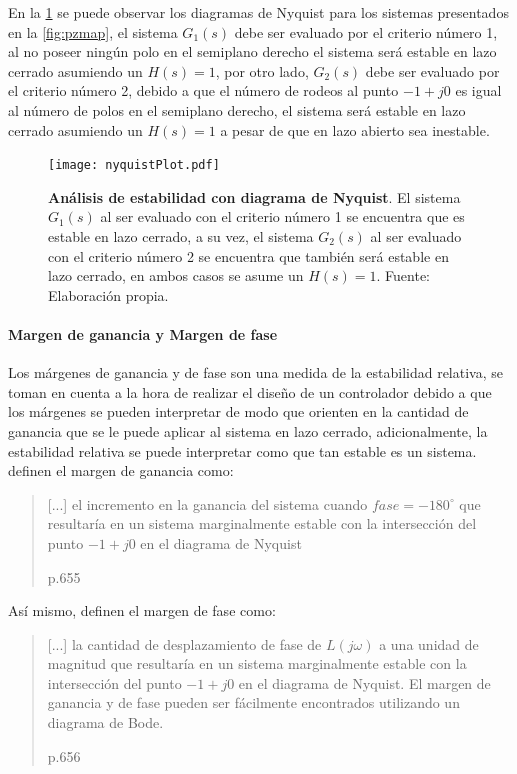                 En la \cref{fig:nyquistPlot} se puede observar los diagramas de Nyquist para los sistemas presentados en la \cref{fig:pzmap}, el sistema $G_1(s)$ debe ser evaluado por el criterio número 1, al no poseer ningún polo en el semiplano derecho el sistema será estable en lazo cerrado asumiendo un $H(s) = 1$, por otro lado, $G_2(s)$ debe ser evaluado por el criterio número 2, debido a que el número de rodeos al punto $-1 + j0$ es igual al número de polos en el semiplano derecho, el sistema será estable en lazo cerrado asumiendo un $H(s) = 1$ a pesar de que en lazo abierto sea inestable.

                \begin{figure}[htb]
                    \centering
                    \texttt{[image: nyquistPlot.pdf]}
                    \caption[Ejemplo de análisis de estabilidad con diagrama de Nyquist]{\textbf{Análisis de estabilidad con diagrama de Nyquist}. El sistema $G_1(s)$ al ser evaluado con el criterio número 1 se encuentra que es estable en lazo cerrado, a su vez, el sistema $G_2(s)$ al ser evaluado con el criterio número 2 se encuentra que también será estable en lazo cerrado, en ambos casos se asume un $H(s) = 1$. Fuente: Elaboración propia.} 
                    \label{fig:nyquistPlot}
                \end{figure}
            
            \paragraph{Margen de ganancia y Margen de fase}
                
                Los márgenes de ganancia y de fase son una medida de la estabilidad relativa, se toman en cuenta a la hora de realizar el diseño de un controlador debido a que los márgenes se pueden interpretar de modo que orienten en la cantidad de ganancia que se le puede aplicar al sistema en lazo cerrado, adicionalmente, la estabilidad relativa se puede interpretar como que tan estable es un sistema. \textcite{dorf2011modern} definen el margen de ganancia como: \blockquote[p.655]{[...] el incremento en la ganancia del sistema cuando $fase = -180^\circ$ que resultaría en un sistema marginalmente estable con la intersección del punto $-1 + j0$ en el diagrama de Nyquist}. Así mismo, \textcite{dorf2011modern} definen el margen de fase como: \blockquote[p.656]{[...] la cantidad de desplazamiento de fase de $L(j\omega)$ a una unidad de magnitud que resultaría en un sistema marginalmente estable con la intersección del punto $-1 + j0$ en el diagrama de Nyquist. El margen de ganancia y de fase pueden ser fácilmente encontrados utilizando un diagrama de Bode.}

